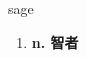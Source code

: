 
\begin{frame}
{\huge sage}
\begin{center}
\begin{enumerate}\Large
  \item \textbf{n. 智者}
\end{enumerate}
\end{center}
\end{frame}
